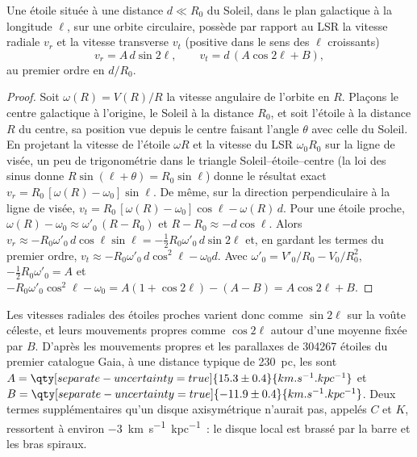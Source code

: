\begin{theorem}\label{thm:b3:milky-way-galaxies:oort}
Une étoile située à une distance $d \ll R_0$ du Soleil, dans le plan galactique à la
longitude $\ell$, sur une orbite circulaire, possède par rapport au LSR la vitesse radiale
$v_r$ et la vitesse transverse $v_t$ (positive dans le sens des $\ell$
croissants)
\[
v_r = A\,d\sin 2\ell, \qquad v_t = d\,(A\cos 2\ell + B),
\]
au premier ordre en $d/R_0$.
\end{theorem}

\begin{proof}
Soit $\omega(R) = V(R)/R$ la vitesse angulaire de l'orbite en $R$. Plaçons
le centre galactique à l'origine, le Soleil à la distance $R_0$, et soit l'étoile à la
distance $R$ du centre, sa position vue depuis le centre faisant l'angle $\theta$ avec
celle du Soleil. En projetant la vitesse de l'étoile $\omega R$ et la vitesse du LSR
$\omega_0 R_0$ sur la ligne de visée, un peu de trigonométrie dans le triangle
Soleil--étoile--centre (la loi des sinus donne $R\sin(\ell + \theta) = R_0\sin\ell$)
donne le résultat exact $v_r = R_0\,[\omega(R) - \omega_0]\sin\ell$.
De même, sur la direction
perpendiculaire à la ligne de visée,
$v_t = R_0\,[\omega(R) - \omega_0]\cos\ell - \omega(R)\,d$. Pour une
étoile proche, $\omega(R) - \omega_0 \approx \omega'_0\,(R - R_0)$ et
$R - R_0 \approx -d\cos\ell$. Alors
$v_r \approx -R_0\omega'_0\,d\cos\ell\sin\ell = -\tfrac12 R_0\omega'_0\,
d\sin 2\ell$ et, en gardant les termes du premier ordre,
$v_t \approx -R_0\omega'_0\,d\cos^2\ell - \omega_0 d$. Avec
$\omega'_0 = V'_0/R_0 - V_0/R_0^2$, $-\tfrac12 R_0\omega'_0 = A$ et
$-R_0\omega'_0\cos^2\ell - \omega_0 = A(1 + \cos 2\ell) - (A - B) =
A\cos 2\ell + B$.
\end{proof}

Les vitesses radiales des étoiles proches varient donc comme $\sin 2\ell$ sur
la voûte céleste, et leurs mouvements propres comme $\cos 2\ell$ autour d'une moyenne fixée par $B$.
D'après les mouvements propres et les parallaxes de \num{304267} étoiles du premier
catalogue Gaia, à une distance typique de \qty{230}{pc}, les 
sont $A = \qty[separate-uncertainty=true]{15.3 \pm 0.4}{km.s^{-1}.kpc^{-1}}$
et $B = \qty[separate-uncertainty=true]{-11.9 \pm 0.4}{km.s^{-1}.kpc^{-1}}$.
Deux termes supplémentaires qu'un disque axisymétrique n'aurait pas,
appelés $C$ et $K$, ressortent à environ \qty{-3}{km.s^{-1}.kpc^{-1}}~:
le disque local est brassé par la barre et les bras spiraux.

